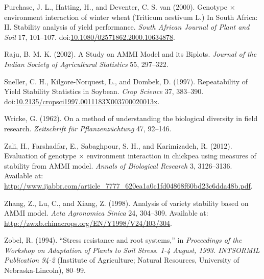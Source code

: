 \documentclass[]{article}
\begin{document}
\leavevmode\hypertarget{ref-purchase_genotype_2000}{}%
Purchase, J. L., Hatting, H., and Deventer, C. S. van (2000). Genotype ×
environment interaction of winter wheat (Triticum aestivum L.) In South
Africa: II. Stability analysis of yield performance. \emph{South African
Journal of Plant and Soil} 17, 101--107.
doi:\href{https://doi.org/10.1080/02571862.2000.10634878}{10.1080/02571862.2000.10634878}.

\leavevmode\hypertarget{ref-raju_study_2002}{}%
Raju, B. M. K. (2002). A Study on AMMI Model and its Biplots.
\emph{Journal of the Indian Society of Agricultural Statistics} 55,
297--322.

\leavevmode\hypertarget{ref-sneller_repeatability_1997}{}%
Sneller, C. H., Kilgore-Norquest, L., and Dombek, D. (1997).
Repeatability of Yield Stability Statistics in Soybean. \emph{Crop
Science} 37, 383--390.
doi:\href{https://doi.org/10.2135/cropsci1997.0011183X003700020013x}{10.2135/cropsci1997.0011183X003700020013x}.

\leavevmode\hypertarget{ref-wricke_method_1962}{}%
Wricke, G. (1962). On a method of understanding the biological diversity
in field research. \emph{Zeitschrift für Pflanzenzüchtung} 47, 92--146.

\leavevmode\hypertarget{ref-zali_evaluation_2012}{}%
Zali, H., Farshadfar, E., Sabaghpour, S. H., and Karimizadeh, R. (2012).
Evaluation of genotype × environment interaction in chickpea using
measures of stability from AMMI model. \emph{Annals of Biological
Research} 3, 3126--3136. Available at:
\url{http://www.ijabbr.com/article_7777_620ea1a0c1fd04868f60bd23c6dda48b.pdf}.

\leavevmode\hypertarget{ref-zhang_analysis_1998}{}%
Zhang, Z., Lu, C., and Xiang, Z. (1998). Analysis of variety stability
based on AMMI model. \emph{Acta Agronomica Sinica} 24, 304--309.
Available at: \url{http://zwxb.chinacrops.org/EN/Y1998/V24/I03/304}.

\leavevmode\hypertarget{ref-zobel_stress_1994}{}%
Zobel, R. (1994). ``Stress resistance and root systems,'' in
\emph{Proceedings of the Workshop on Adaptation of Plants to Soil
Stress. 1-4 August, 1993. INTSORMIL Publication 94-2} (Institute of
Agriculture; Natural Resources, University of Nebraska-Lincoln), 80--99.
\end{document}

